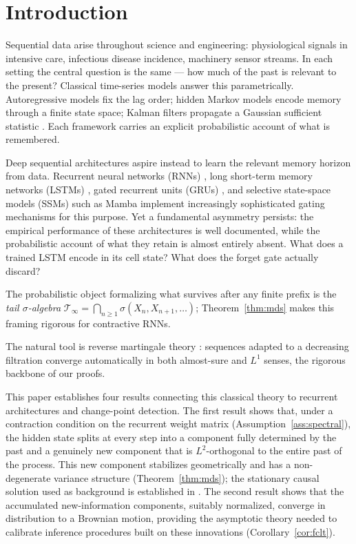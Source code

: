 \documentclass[bj,authoryear]{imsart}
\theoremstyle{plain}
\theoremstyle{definition}
\newcommand{\Tsig}{\mathcal{T}_\infty}
\begin{document}
\section{Introduction}
\label{sec:intro}

Sequential data arise throughout science and engineering: physiological signals in
intensive care, infectious disease incidence, machinery sensor streams.  In each
setting the central question is the same --- how much of the past is relevant to
the present?  Classical time-series models answer this parametrically.
Autoregressive models fix the lag order; hidden Markov models encode memory
through a finite state space; Kalman filters propagate a Gaussian sufficient
statistic \citep{box2015time, hamilton1994time}.  Each framework carries an
explicit probabilistic account of what is remembered.

Deep sequential architectures aspire instead to learn the relevant memory horizon
from data.  Recurrent neural networks (RNNs) \citep{rumelhart1986learning}, long short-term
memory networks (LSTMs) \citep{hochreiter1997long}, gated recurrent units
(GRUs) \citep{cho2014learning}, and selective state-space models (SSMs)
such as Mamba \citep{gu2023mamba} implement increasingly
sophisticated gating mechanisms for this purpose.  Yet a fundamental asymmetry
persists: the empirical performance of these architectures is well documented,
while the probabilistic account of what they retain is almost entirely absent.
What does a trained LSTM encode in its cell state?  What does the forget gate
actually discard?

The probabilistic object formalizing what survives after any finite prefix is
the \emph{tail $\sigma$-algebra} $\Tsig=\bigcap_{n\geq1}\sigma(X_n,X_{n+1},\ldots)$;
Theorem~\ref{thm:mds} makes this framing rigorous for contractive RNNs.

The natural tool is reverse martingale theory
\citep{doob1953stochastic,williams1991probability}: sequences adapted to a
decreasing filtration converge automatically in both almost-sure and $L^1$
senses, the rigorous backbone of our proofs.

This paper establishes four results connecting this classical theory to
recurrent architectures and change-point detection.
%
The first result shows that, under a contraction condition on the recurrent
weight matrix (Assumption~\ref{ass:spectral}), the hidden state splits at
every step into a component fully determined by the past and a genuinely new
component that is $L^2$-orthogonal to the entire past of the process.
This new component stabilizes geometrically and has a non-degenerate variance
structure (Theorem~\ref{thm:mds}); the stationary causal solution used as
background is established in \citet{chang2026jrssb}.
%
The second result shows that the accumulated new-information components,
suitably normalized, converge in distribution to a Brownian motion,
providing the asymptotic theory needed to calibrate inference procedures
built on these innovations (Corollary~\ref{cor:fclt}).
\end{document}
